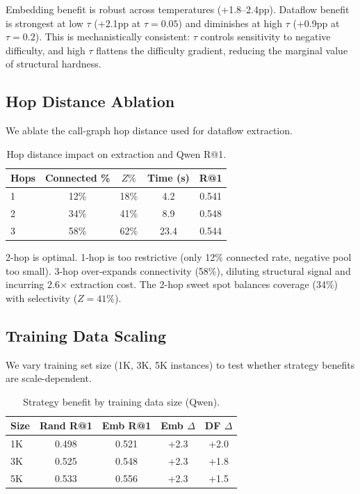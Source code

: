 \documentclass[11pt,a4paper]{article}
\begin{document}
Embedding benefit is robust across temperatures (+1.8--2.4pp). Dataflow benefit is strongest at low $\tau$ (+2.1pp at $\tau{=}0.05$) and diminishes at high $\tau$ (+0.9pp at $\tau{=}0.2$). This is mechanistically consistent: $\tau$ controls sensitivity to negative difficulty, and high $\tau$ flattens the difficulty gradient, reducing the marginal value of structural hardness.

\subsection{Hop Distance Ablation}

We ablate the call-graph hop distance used for dataflow extraction.

\begin{table}[t]
\centering
\small
\caption{Hop distance impact on extraction and Qwen R@1.}
\label{tab:hop}
\begin{tabular}{lcccc}
\toprule
\textbf{Hops} & \textbf{Connected \%} & \textbf{$Z\%$} & \textbf{Time (s)} & \textbf{R@1} \\
\midrule
1 & 12\% & 18\% & 4.2 & 0.541 \\
2 & 34\% & 41\% & 8.9 & 0.548 \\
3 & 58\% & 62\% & 23.4 & 0.544 \\
\bottomrule
\end{tabular}
\end{table}

2-hop is optimal. 1-hop is too restrictive (only 12\% connected rate, negative pool too small). 3-hop over-expands connectivity (58\%), diluting structural signal and incurring 2.6$\times$ extraction cost. The 2-hop sweet spot balances coverage (34\%) with selectivity ($Z{=}41\%$).

\subsection{Training Data Scaling}

We vary training set size (1K, 3K, 5K instances) to test whether strategy benefits are scale-dependent.

\begin{table}[t]
\centering
\small
\caption{Strategy benefit by training data size (Qwen).}
\label{tab:scaling}
\begin{tabular}{lcccc}
\toprule
\textbf{Size} & \textbf{Rand R@1} & \textbf{Emb R@1} & \textbf{Emb $\Delta$} & \textbf{DF $\Delta$} \\
\midrule
1K & 0.498 & 0.521 & +2.3 & +2.0 \\
3K & 0.525 & 0.548 & +2.3 & +1.8 \\
5K & 0.533 & 0.556 & +2.3 & +1.5 \\
\bottomrule
\end{tabular}
\end{table}
\end{document}
